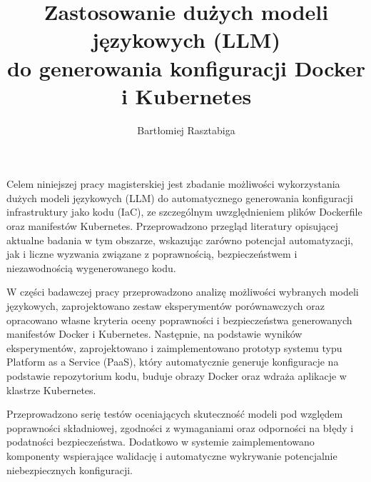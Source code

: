 \documentclass[
    bindingoffset=5mm,  %
    footnoteindent=3mm, %
    hyphenation=true    %
]{src/wut-thesis}
\begin{document}

\title{
    Zastosowanie dużych modeli językowych (LLM) \\ 
    do generowania konfiguracji Docker i Kubernetes
}
\author{Bartłomiej Rasztabiga}
\date{\the\year}
\maketitle

\cleardoublepage %
\abstract
Celem niniejszej pracy magisterskiej jest zbadanie możliwości wykorzystania dużych modeli językowych (LLM) do automatycznego generowania konfiguracji infrastruktury jako kodu (IaC), ze szczególnym uwzględnieniem plików Dockerfile oraz manifestów Kubernetes. Przeprowadzono przegląd literatury opisującej aktualne badania w tym obszarze, wskazując zarówno potencjał automatyzacji, jak i liczne wyzwania związane z poprawnością, bezpieczeństwem i niezawodnością wygenerowanego kodu.

W części badawczej pracy przeprowadzono analizę możliwości wybranych modeli językowych, zaprojektowano zestaw eksperymentów porównawczych oraz opracowano własne kryteria oceny poprawności i bezpieczeństwa generowanych manifestów Docker i Kubernetes. Następnie, na podstawie wyników eksperymentów, zaprojektowano i zaimplementowano prototyp systemu typu Platform as a Service (PaaS), który automatycznie generuje konfiguracje na podstawie repozytorium kodu, buduje obrazy Docker oraz wdraża aplikacje w klastrze Kubernetes.

Przeprowadzono serię testów oceniających skuteczność modeli pod względem poprawności składniowej, zgodności z wymaganiami oraz odporności na błędy i podatności bezpieczeństwa. Dodatkowo w systemie zaimplementowano komponenty wspierające walidację i automatyczne wykrywanie potencjalnie niebezpiecznych konfiguracji.
\end{document}
